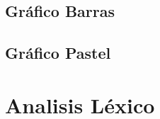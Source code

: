 \documentclass[10pt,xcolor={dvipsnames}]{beamer}
\begin{document}
     
    \subsection{Gráfico Barras}
            
    \subsection{Gráfico Pastel}
        
    
    
    \section{Analisis Léxico}

        
\end{document}
